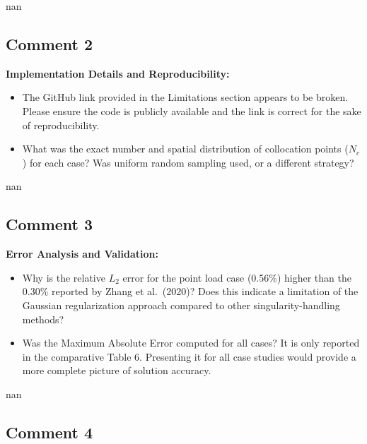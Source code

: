 \documentclass{ar2rc}
\begin{document}
  \AR nan

  \subsection{Comment 2}

	\RC\textbf{Implementation Details and Reproducibility:}
    \begin{itemize}
        \item The GitHub link provided in the Limitations section appears to be broken. Please ensure the code is publicly available and the link is correct for the sake of reproducibility.
        \item What was the exact number and spatial distribution of collocation points ($N_c$) for each case? Was uniform random sampling used, or a different strategy?
    \end{itemize}
	
  \AR nan

  \subsection{Comment 3}

	\RC\textbf{Error Analysis and Validation:}
    \begin{itemize}
        \item Why is the relative $L_2$ error for the point load case (0.56\%) higher than the 0.30\% reported by Zhang et al.\ (2020)? Does this indicate a limitation of the Gaussian regularization approach compared to other singularity-handling methods?
        \item Was the Maximum Absolute Error computed for all cases? It is only reported in the comparative Table 6. Presenting it for all case studies would provide a more complete picture of solution accuracy.
    \end{itemize}

	\AR nan

  \subsection{Comment 4}
	
\end{document}

